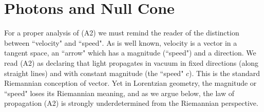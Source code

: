 \documentclass[12pt]{amsart}
\begin{document}







\section{Photons and Null Cone}\label{s3}


For a proper analysis of (A2) we must remind the reader of the distinction between ``velocity" and ``speed".  As is well known, velocity is a vector in a tangent space, an ``arrow" which has a magnitude (``speed") and a direction. We read (A2) as declaring that light propagates in vacuum in fixed directions (along straight lines) and with constant magnitude (the ``speed" $c$). This is the standard Riemannian conception of vector. Yet in Lorentzian geometry, the magnitude or ``speed" loses its Riemannian meaning, and as we argue below, the law of propagation (A2) is strongly underdetermined from the Riemannian perspective. 





\end{document}
